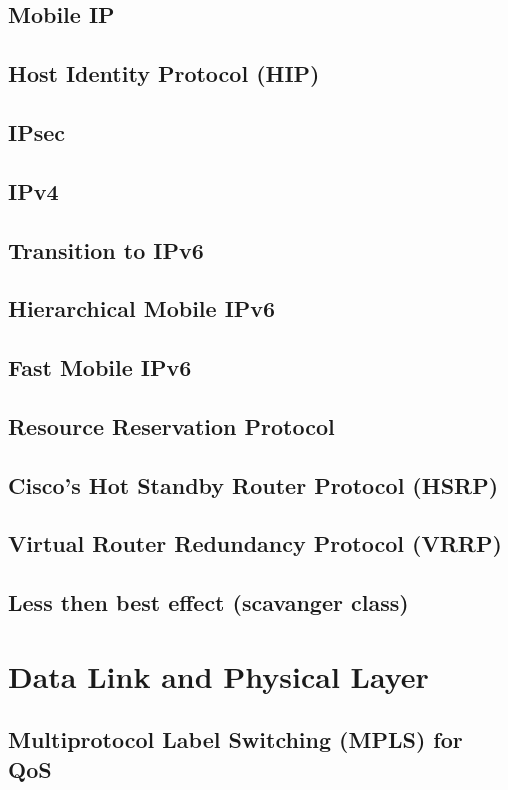 \documentclass[journal]{IEEEtran}
\begin{document}
\subsection{Mobile IP}
\subsection{Host Identity Protocol (HIP)}
\subsection{IPsec}
\subsection{IPv4}
\subsection{Transition to IPv6}
\subsection{Hierarchical Mobile IPv6}
\subsection{Fast Mobile IPv6}
\subsection{Resource Reservation Protocol}
\subsection{Cisco's Hot Standby Router Protocol (HSRP)}
\subsection{Virtual Router Redundancy Protocol (VRRP)}
\subsection{Less then best effect (scavanger class)}

\section{Data Link and Physical Layer}
\subsection{ Multiprotocol Label Switching (MPLS) for QoS }
\end{document}
